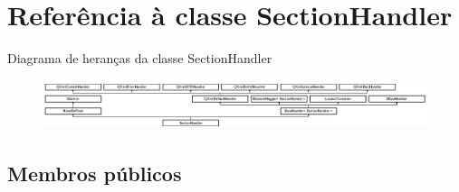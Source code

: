 \hypertarget{class_section_handler}{\section{Referência à classe Section\-Handler}
\label{class_section_handler}
}
Diagrama de heranças da classe Section\-Handler\begin{figure}[H]
\begin{center}
\leavevmode
\includegraphics[height=1.461187cm]{class_section_handler}
\end{center}
\end{figure}
\subsection*{Membros públicos}
